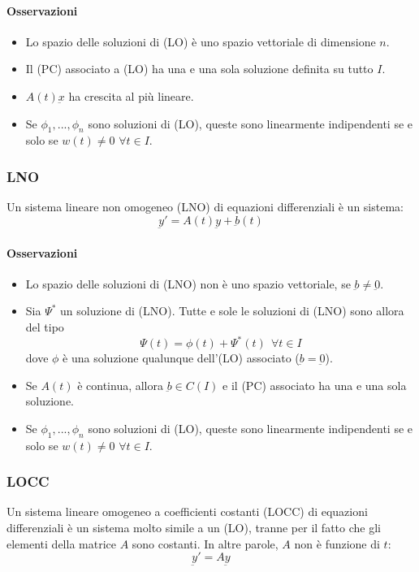 \documentclass[a4paper,12pt]{article}
\begin{document}
\paragraph{Osservazioni}
\begin{itemize}
 \item Lo spazio delle soluzioni di (LO) è uno spazio vettoriale di dimensione $n$.
 \item Il (PC) associato a (LO) ha una e una sola soluzione definita su tutto $I$.
 \item $A(t)\underbar{x}$ ha crescita al più lineare.
 \item Se $\phi_1,...,\phi_n$ sono soluzioni di (LO), queste sono linearmente indipendenti se e solo se $w(t)\neq0$ $\forall t \in I$.
\end{itemize}

\subsubsection{LNO}
Un sistema lineare non omogeneo (LNO) di equazioni differenziali è un sistema:
$$\underbar{y}' = A(t)\underbar{y} + \underbar{b}(t)$$
\paragraph{Osservazioni}
\begin{itemize}
 \item Lo spazio delle soluzioni di (LNO) non è uno spazio vettoriale, se $\underbar{b}\neq\underbar{0}$.
 \item Sia $\Psi^*$ un soluzione di (LNO). Tutte e sole le soluzioni di (LNO) sono allora del tipo
       $$ \Psi(t) = \phi(t) + \Psi^*(t)\ \ \forall t \in I$$
       dove $\phi$ è una soluzione qualunque dell'(LO) associato ($\underbar{b}=\underbar{0}$).
 \item Se $A(t)$ è continua, allora $\underbar{b}\in C(I)$ e il (PC) associato ha una e una sola soluzione.
 \item Se $\phi_1,...,\phi_n$ sono soluzioni di (LO), queste sono linearmente indipendenti se e solo se $w(t)\neq0$ $\forall t \in I$.
\end{itemize}

\subsubsection{LOCC}
Un sistema lineare omogeneo a coefficienti costanti (LOCC) di equazioni differenziali è un sistema molto simile a un (LO), tranne per il fatto che gli elementi della matrice $A$ sono costanti. In altre parole, $A$ non è funzione di $t$:
$$\underbar{y}' = A\underbar{y}$$
\end{document}
